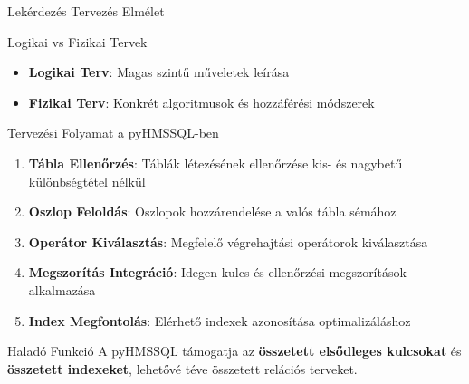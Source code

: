 \documentclass[aspectratio=169]{beamer}
\begin{document}
\begin{frame}{Lekérdezés Tervezés Elmélet}
\begin{block}{Logikai vs Fizikai Tervek}
\begin{itemize}
    \item \textbf{Logikai Terv}: Magas szintű műveletek leírása
    \item \textbf{Fizikai Terv}: Konkrét algoritmusok és hozzáférési módszerek
\end{itemize}
\end{block}

\begin{block}{Tervezési Folyamat a pyHMSSQL-ben}
\begin{enumerate}
    \item \textbf{Tábla Ellenőrzés}: Táblák létezésének ellenőrzése kis- és nagybetű különbségtétel nélkül
    \item \textbf{Oszlop Feloldás}: Oszlopok hozzárendelése a valós tábla sémához
    \item \textbf{Operátor Kiválasztás}: Megfelelő végrehajtási operátorok kiválasztása
    \item \textbf{Megszorítás Integráció}: Idegen kulcs és ellenőrzési megszorítások alkalmazása
    \item \textbf{Index Megfontolás}: Elérhető indexek azonosítása optimalizáláshoz
\end{enumerate}
\end{block}

\begin{alertblock}{Haladó Funkció}
A pyHMSSQL támogatja az \textbf{összetett elsődleges kulcsokat} és \textbf{összetett indexeket}, lehetővé téve összetett relációs terveket.
\end{alertblock}
\end{frame}
\end{document}

